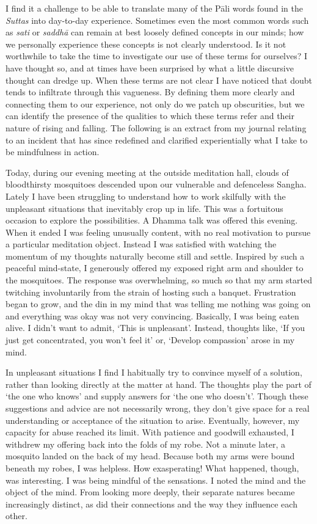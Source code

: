 
I find it a challenge to be able to translate many of the Pāli words
found in the \emph{Suttas} into day-to-day experience. Sometimes even the most
common words such as \emph{sati} or \emph{saddhā} can remain at best
loosely defined concepts in our minds; how we personally experience
these concepts is not clearly understood. Is it not worthwhile to take
the time to investigate our use of these terms for ourselves? I have
thought so, and at times have been surprised by what a little discursive
thought can dredge up. When these terms are not clear I have noticed
that doubt tends to infiltrate through this vagueness. By defining them
more clearly and connecting them to our experience, not only do we patch
up obscurities, but we can identify the presence of the qualities to
which these terms refer and their nature of rising and falling. The
following is an extract from my journal relating to an incident that has
since redefined and clarified experientially what I take to be
mindfulness in action. 

Today, during our evening meeting at the outside meditation hall, clouds
of bloodthirsty mosquitoes descended upon our vulnerable and defenceless
Sangha. Lately I have been struggling to understand how to work
skilfully with the unpleasant situations that inevitably crop up in
life. This was a fortuitous occasion to explore the possibilities. A
Dhamma talk was offered this evening. When it ended I was feeling
unusually content, with no real motivation to pursue a particular
meditation object. Instead I was satisfied with watching the momentum of
my thoughts naturally become still and settle. Inspired by such a
peaceful mind-state, I generously offered my exposed right arm and
shoulder to the mosquitoes. The response was overwhelming, so much so
that my arm started twitching involuntarily from the strain of hosting
such a banquet. Frustration began to grow, and the din in my mind that
was telling me nothing was going on and everything was okay was not very
convincing. Basically, I was being eaten alive. I didn't want to admit, 
`This is unpleasant'. Instead, thoughts like, `If you just get
concentrated, you won't feel it' or, `Develop compassion' arose in my
mind. 

In unpleasant situations I find I habitually try to convince myself of a
solution, rather than looking directly at the matter at hand. The
thoughts play the part of `the one who knows' and supply answers for
`the one who doesn't'. Though these suggestions and advice are not
necessarily wrong, they don't give space for a real understanding or
acceptance of the situation to arise. Eventually, however, my capacity
for abuse reached its limit. With patience and goodwill exhausted, I
withdrew my offering back into the folds of my robe. Not a minute later, 
a mosquito landed on the back of my head. Because both my arms were
bound beneath my robes, I was helpless. How exasperating! What happened, 
though, was interesting. I was being mindful of the sensations. I noted
the mind and the object of the mind. From looking more deeply, their
separate natures became increasingly distinct, as did their connections
and the way they influence each other. 


